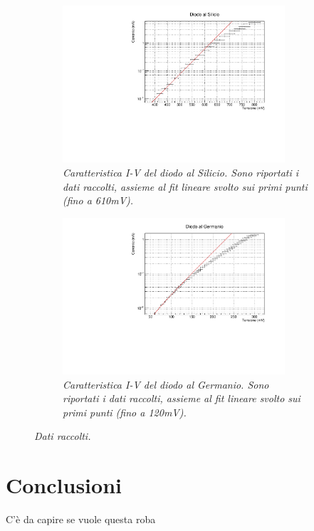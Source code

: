 \documentclass[11pt, a4paper, twoside]{article}
\begin{document}
  \begin{figure}%
    \centering
    \begin{subfigure}[t]{.47\textwidth}
      \includegraphics[width=8.25cm]{./assets/1/Silicio2.pdf}
      \caption{
        \emph{
          Caratteristica I-V del diodo al Silicio. Sono riportati i dati raccolti, assieme al fit lineare svolto sui primi punti (fino a 610mV).
        }
      }
      \label{fig:caratteristica-silicio}
    \end{subfigure}
    \hspace{5mm}
    \begin{subfigure}[t]{.47\textwidth}
      \includegraphics[width=8.25cm]{./assets/1/Germanio2.pdf}
      \caption{
        \emph{
           Caratteristica I-V del diodo al Germanio. Sono riportati i dati raccolti, assieme al fit lineare svolto sui primi punti (fino a 120mV).
        }
      }
      \label{fig:caratteristica-germanio}
    \end{subfigure}
    \caption{\emph{Dati raccolti.}
    \label{fig:caratteristiche-iv}}
  \end{figure}

\section{Conclusioni}\label{sec:conclusioni}
  C'è da capire se vuole questa roba
\end{document}
